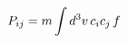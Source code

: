 \documentclass[preview]{standalone}
\begin{document}
\begin{align*}
\special{dvisvgm:raw <g id='unique000'>}P_{ij}=m\int d^3v\,c_ic_j\,f\special{dvisvgm:raw </g>}
\end{align*}
\end{document}
